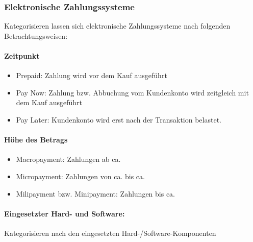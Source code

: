 \newpage

\subsubsection{Elektronische Zahlungssysteme}
Kategorisieren lassen sich elektronische Zahlungssysteme nach folgenden Betrachtungsweisen:
\paragraph{Zeitpunkt}
\begin{itemize}
     \item Prepaid: Zahlung wird vor dem Kauf ausgeführt
     \item Pay Now: Zahlung bzw. Abbuchung vom Kundenkonto wird zeitgleich mit dem Kauf ausgeführt
     \item Pay Later: Kundenkonto wird erst nach der Transaktion belastet.
\end{itemize}

\paragraph{Höhe des Betrags}
\begin{itemize}
     \item Macropayment: Zahlungen ab ca. 
     \item Micropayment: Zahlungen von ca.  bis ca. 
     \item Milipayment bzw. Minipayment: Zahlungen bis ca. 
\end{itemize}

\paragraph{Eingesetzter Hard- und Software:} Kategorisieren nach den eingesetzten Hard-/Software-Komponenten


